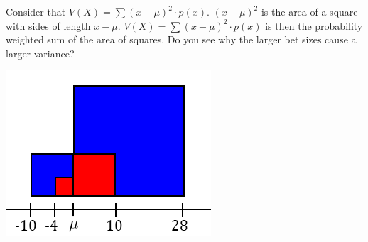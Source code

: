 \documentclass[
]{book}
\theoremstyle{definition}
\theoremstyle{definition}
\theoremstyle{definition}
\theoremstyle{remark}
\begin{document}
Consider that \(V(X)=\sum (x - \mu)^2 \cdot p(x)\). \((x - \mu)^2\) is the area of a square with sides of length \(x - \mu\). \(V(X)=\sum (x - \mu)^2 \cdot p(x)\) is then the probability weighted sum of the area of squares. Do you see why the larger bet sizes cause a larger variance?

\includegraphics{Pictures/05-Expectations/squares.PNG}

\backmatter
  
\end{document}
